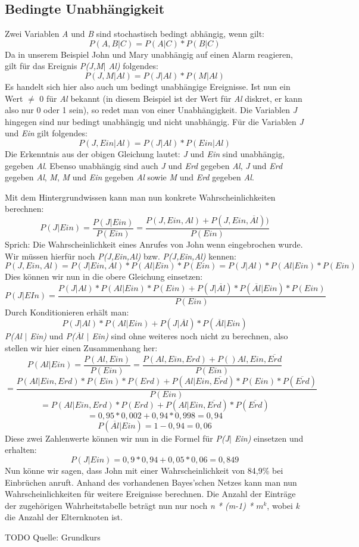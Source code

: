 \subsection{Bedingte Unabhängigkeit}  
Zwei Variablen \textit{A} und \textit{B} sind stochastisch bedingt abhängig, wenn gilt:
\[ P(A,B\vert C) = P(A\vert C) * P(B\vert C)\]
Da in unserem Beispiel John und Mary unabhängig auf einen Alarm reagieren, gilt für das Ereignis \textit{P(J,M$\vert$ Al)} folgendes:
\[ P(J,M\vert Al) = P(J\vert Al) * P(M\vert Al)\]
Es handelt sich hier also auch um bedingt unabhängige Ereignisse. Ist nun ein Wert $\neq$ 0 für \textit{Al} bekannt (in diesem Beispiel ist der Wert für \textit{Al} diskret, er kann also nur 0 oder 1 sein), so redet man von einer Unabhängigkeit. Die Variablen \textit{J} hingegen sind nur bedingt unabhängig und nicht unabhängig. 
Für die Variablen \textit{J} und \textit{Ein} gilt folgendes:
\[ P(J,Ein\vert Al) = P(J\vert Al) * P(Ein\vert Al)\]
Die Erkenntnis aus der obigen Gleichung lautet: \textit{J} und \textit{Ein} sind unabhängig, gegeben \textit{Al}. Ebenso unabhängig sind auch \textit{J} und \textit{Erd} gegeben \textit{Al}, \textit{J} und \textit{Erd} gegeben \textit{Al}, \textit{M}, \textit{M} und \textit{Ein} gegeben \textit{Al} sowie \textit{M} und \textit{Erd} gegeben \textit{Al}. 

Mit dem Hintergrundwissen kann man nun konkrete Wahrscheinlichkeiten berechnen:
\[ P(J\vert Ein) = \frac{P(J\vert Ein)}{P(Ein)}  = \frac{P(J,Ein,Al) + P(J,Ein, \overline{Al}))}{P(Ein)} \]
Sprich: Die Wahrscheinlichkeit eines Anrufes von John wenn eingebrochen wurde.
Wir müssen hierfür noch \textit{P(J,Ein,Al)} bzw. \textit{P(J,Ein,Al)} kennen:
\[ P(J, Ein, Al) = P(J\vert Ein, Al) * P(Al\vert Ein) * P(Ein) = P(J\vert Al) * P(Al\vert Ein) * P(Ein) \] 
Dies können wir nun in die obere Gleichung einsetzen:
\[ P(J\vert EIn) =  \frac{P(J\vert	Al) * P(Al\vert Ein) * P(Ein) + P(J\vert \overline{Al}) * P(\overline{Al} \vert Ein) * P(Ein) }{P(Ein)}  \]
Durch Konditionieren erhält man:
\[ P(J\vert Al) * P(Al\vert Ein) + P(J\vert \overline{Al}) * P(\overline{Al} \vert Ein) \]
\textit{P(Al $\vert$ Ein)} und \textit{P($\overline{Al}$ $\vert$ Ein)} sind ohne weiteres noch nicht zu berechnen, also stellen wir hier einen Zusammenhang her:
\[ P(Al\vert Ein) = \frac{P(Al, Ein)}{P(Ein)} = \frac{P(Al,Ein,Erd) + P()Al,Ein, \overline{Erd} }{P(Ein)}  \]
\[ = \frac{P(Al\vert Ein, Erd) * P(Ein) * P(Erd) + P(Al\vert Ein, \overline{Erd}) * P(Ein) * P(\overline{Erd}) }{P(Ein)}\]
\[ = P(Al\vert Ein, Erd) * P(Erd) + P(Al\vert Ein, \overline{Erd}) * P(\overline{Erd}) \]
\[ = 0,95 * 0,002 + 0,94 * 0,998 = 0,94 \]
\[ P(\overline{Al}\vert Ein) = 1-0,94 = 0,06 \]
Diese zwei Zahlenwerte können wir nun in die Formel für \textit{P(J$\vert$ Ein)} einsetzen und erhalten:
\[ P(J\vert Ein) = 0,9 * 0,94 + 0,05 * 0,06 = 0,849 \]
Nun könne wir sagen, dass John mit einer Wahrscheinlichkeit von 84,9\% bei Einbrüchen anruft. Anhand des vorhandenen Bayes'schen Netzes kann man nun Wahrscheinlichkeiten für weitere Ereignisse berechnen. 
Die Anzahl der Einträge der zugehörigen Wahrheitstabelle beträgt nun nur noch \textit{n * (m-1) * $m^k$}, wobei \textit{k} die Anzahl der Elternknoten ist.

TODO Quelle: Grundkurs

